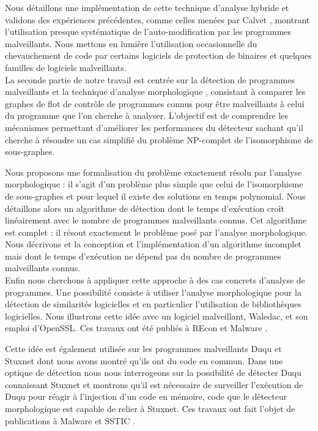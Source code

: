 Nous détaillons une implémentation de cette technique d'analyse hybride et validons des expériences précédentes, comme celles menées par Calvet  \cite{Calvet2013}, montrant l'utilisation presque systématique de l'auto-modification par les programmes malveillants.
Nous mettons en lumière l'utilisation occasionnelle du chevauchement de code par certains logiciels de protection de binaires et quelques familles de logiciels malveillants.
\\

La seconde partie de notre travail est centrée sur la détection de programmes malveillants et la technique d'analyse morphologique \cite{BKM08}, consistant à comparer les graphes de flot de contrôle de programmes connus pour être malveillants à celui du programme que l'on cherche à analyser.
L'objectif est de comprendre les mécanismes permettant d'améliorer les performances du détecteur sachant qu'il cherche à résoudre un cas simplifié du problème NP-complet de l'isomorphisme de sous-graphes.


Nous proposons une formalisation du problème exactement résolu par l'analyse morphologique : il s'agit d'un problème plus simple que celui de l'isomorphisme de sous-graphes et pour lequel il existe des solutions en temps polynomial.
Nous détaillons alors un algorithme de détection dont le temps d'exécution croît linéairement avec le nombre de programmes malveillants connus. Cet algorithme est complet : il résout exactement le problème posé par l'analyse morphologique.
Nous décrivons et la conception et l'implémentation d'un algorithme incomplet mais dont le temps d'exécution ne dépend pas du nombre de programmes malveillants connus.
\\

Enfin nous cherchons à appliquer cette approche à des cas concrets d'analyse de programmes.
Une possibilité consiste à utiliser l'analyse morphologique pour la détection de similarités logicielles et en particulier l'utilisation de bibliothèques logicielles.
Nous illustrons cette idée avec un logiciel malveillant, Waledac, et son emploi d'OpenSSL.
Ces travaux ont été publiés à REcon \cite{REAT12} et Malware \cite{mal12}.

Cette idée est également utilisée sur les programmes malveillants Duqu et Stuxnet dont nous avons montré qu'ils ont du code en commun.
Dans une optique de détection nous nous interrogeons sur la possibilité de détecter Duqu connaissant Stuxnet et montrons qu'il est nécessaire de surveiller l'exécution de Duqu pour réagir à l'injection d'un code en mémoire, code que le détecteur morphologique est capable de relier à Stuxnet.
Ces travaux ont fait l'objet de publications à Malware \cite{mal13} et SSTIC \cite{sstic13}.

